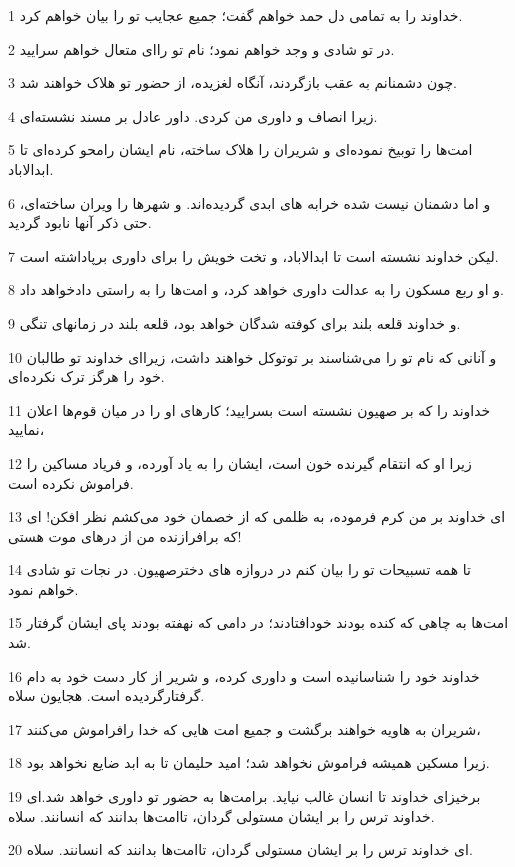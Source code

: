 \par 1 خداوند را به تمامی دل حمد خواهم گفت؛ جمیع عجایب تو را بیان خواهم کرد.
\par 2 در تو شادی و وجد خواهم نمود؛ نام تو راای متعال خواهم سرایید.
\par 3 چون دشمنانم به عقب بازگردند، آنگاه لغزیده، از حضور تو هلاک خواهند شد.
\par 4 زیرا انصاف و داوری من کردی. داور عادل بر مسند نشسته‌ای.
\par 5 امت‌ها را توبیخ نموده‌ای و شریران را هلاک ساخته، نام ایشان رامحو کرده‌ای تا ابدالاباد.
\par 6 و اما دشمنان نیست شده خرابه های ابدی گردیده‌اند. و شهرها را ویران ساخته‌ای، حتی ذکر آنها نابود گردید.
\par 7 لیکن خداوند نشسته است تا ابدالاباد، و تخت خویش را برای داوری برپاداشته است.
\par 8 و او ربع مسکون را به عدالت داوری خواهد کرد، و امت‌ها را به راستی دادخواهد داد.
\par 9 و خداوند قلعه بلند برای کوفته شدگان خواهد بود، قلعه بلند در زمانهای تنگی.
\par 10 و آنانی که نام تو را می‌شناسند بر توتوکل خواهند داشت، زیرا‌ای خداوند تو طالبان خود را هرگز ترک نکرده‌ای.
\par 11 خداوند را که بر صهیون نشسته است بسرایید؛ کارهای او را در میان قوم‌ها اعلان نمایید،
\par 12 زیرا او که انتقام گیرنده خون است، ایشان را به یاد آورده، و فریاد مساکین را فراموش نکرده است.
\par 13 ‌ای خداوند بر من کرم فرموده، به ظلمی که از خصمان خود می‌کشم نظر افکن! ای که برافرازنده من از درهای موت هستی!
\par 14 تا همه تسبیحات تو را بیان کنم در دروازه های دخترصهیون. در نجات تو شادی خواهم نمود.
\par 15 امت‌ها به چاهی که کنده بودند خودافتادند؛ در دامی که نهفته بودند پای ایشان گرفتار شد.
\par 16 خداوند خود را شناسانیده است و داوری کرده، و شریر از کار دست خود به دام گرفتارگردیده است. هجایون سلاه.
\par 17 شریران به هاویه خواهند برگشت و جمیع امت هایی که خدا رافراموش می‌کنند،
\par 18 زیرا مسکین همیشه فراموش نخواهد شد؛ امید حلیمان تا به ابد ضایع نخواهد بود.
\par 19 برخیز‌ای خداوند تا انسان غالب نیاید. برامت‌ها به حضور تو داوری خواهد شد.‌ای خداوند ترس را بر ایشان مستولی گردان، تاامت‌ها بدانند که انسانند. سلاه.
\par 20 ‌ای خداوند ترس را بر ایشان مستولی گردان، تاامت‌ها بدانند که انسانند. سلاه.
 
